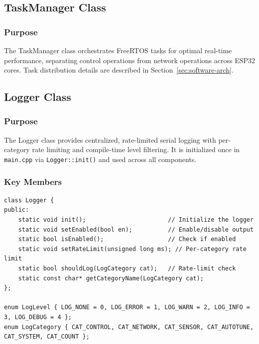 \subsection{TaskManager Class}

\subsubsection{Purpose}
The TaskManager class orchestrates FreeRTOS tasks for optimal real-time performance, separating control operations from network operations across ESP32 cores. Task distribution details are described in Section~\ref{sec:software-arch}.

\subsection{Logger Class}

\subsubsection{Purpose}
The Logger class provides centralized, rate-limited serial logging with per-category rate limiting and compile-time level filtering. It is initialized once in \texttt{main.cpp} via \texttt{Logger::init()} and used across all components.

\subsubsection{Key Members}
\begin{lstlisting}[caption=Logger Class - Key Members]
class Logger {
public:
    static void init();                       // Initialize the logger
    static void setEnabled(bool en);          // Enable/disable output
    static bool isEnabled();                  // Check if enabled
    static void setRateLimit(unsigned long ms); // Per-category rate limit
    static bool shouldLog(LogCategory cat);   // Rate-limit check
    static const char* getCategoryName(LogCategory cat);
};

enum LogLevel { LOG_NONE = 0, LOG_ERROR = 1, LOG_WARN = 2, LOG_INFO = 3, LOG_DEBUG = 4 };
enum LogCategory { CAT_CONTROL, CAT_NETWORK, CAT_SENSOR, CAT_AUTOTUNE, CAT_SYSTEM, CAT_COUNT };
\end{lstlisting}
